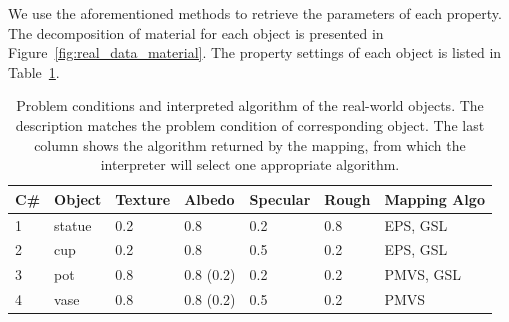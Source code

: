 We use the aforementioned methods to retrieve the parameters of each property. The decomposition of material for each object is presented in Figure~\ref{fig:real_data_material}. The property settings of each object is listed in Table~\ref{tab:real_data_prop_list}.
\begin{table}[!htbp]
  \centering
  \begin{tabular}{lllllll}
  \toprule
  C\# & Object & Texture & Albedo & Specular & Rough & Mapping Algo\\
  \midrule
  1 & statue & 0.2 & 0.8 & 0.2 & 0.8 & EPS, GSL\\
  2 & cup & 0.2 & 0.8 & 0.5 & 0.2 & EPS, GSL\\
  3 & pot & 0.8 & 0.8 (0.2) & 0.2 & 0.2 & PMVS, GSL\\
  4 & vase & 0.8 & 0.8 (0.2) & 0.5 & 0.2 & PMVS\\
  \bottomrule
  \end{tabular}
  \caption{Problem conditions and interpreted algorithm of the real-world objects. The description matches the problem condition of corresponding object. The last column shows the algorithm returned by the mapping, from which the interpreter will select one appropriate algorithm.}
  \label{tab:real_data_prop_list}
\end{table}


